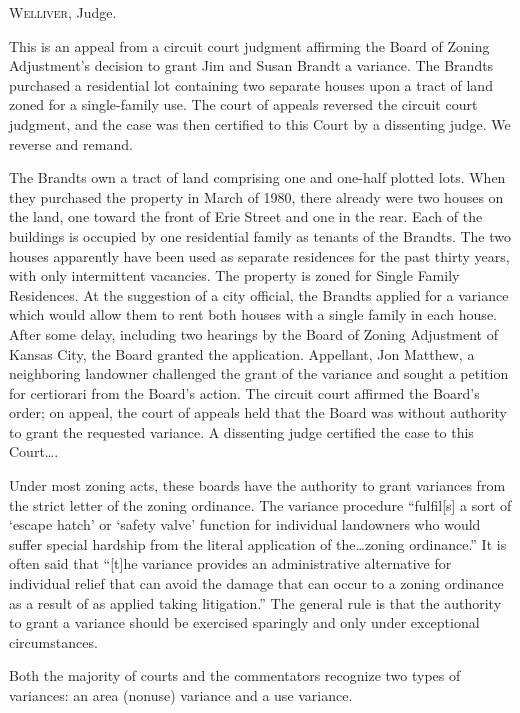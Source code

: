 

\opinion \textsc{Welliver}, Judge.

This is an appeal from a circuit court judgment affirming the Board of Zoning
Adjustment's decision to grant Jim and Susan Brandt a variance. The Brandts
purchased a residential lot containing two separate houses upon a tract of land
zoned for a single-family use. The court of appeals reversed the circuit court
judgment, and the case was then certified to this Court by a dissenting judge.
We reverse and remand. 

The Brandts own a tract of land comprising one and one-half plotted lots. When
they purchased the property in March of 1980, there already were two houses on
the land, one toward the front of Erie Street and one in the rear. Each of the
buildings is occupied by one residential family as tenants of the Brandts. The
two houses apparently have been used as separate residences for the past thirty
years, with only intermittent vacancies. The property is zoned for Single Family
Residences. At the suggestion of a city official, the Brandts applied for a
variance which would allow them to rent both houses with a single family in each
house. After some delay, including two hearings by the Board of Zoning
Adjustment of Kansas City, the Board granted the application. Appellant, Jon
Matthew, a neighboring landowner challenged the grant of the variance and sought
a petition for certiorari from the Board's action. The circuit court affirmed
the Board's order; on appeal, the court of appeals held that the Board was
without authority to grant the requested variance. A dissenting judge certified
the case to this Court\ldots .

Under most zoning acts, these boards have the authority to grant variances from
the strict letter of the zoning ordinance. The variance procedure ``fulfil[s] a
sort of `escape hatch' or `safety valve' function for individual landowners who
would suffer special hardship from the literal application of the\ldots zoning
ordinance.'' It is often said that ``[t]he variance provides an administrative
alternative for individual relief that can avoid the damage that can occur to a
zoning ordinance as a result of as applied taking litigation.'' The general rule
is that the authority to grant a variance should be exercised sparingly and only
under exceptional circumstances. 

Both the majority of courts and the commentators recognize two types of
variances: an area (nonuse) variance and a use variance.

